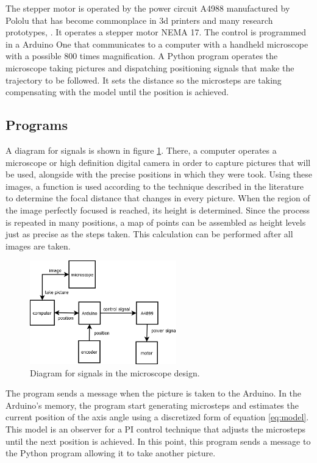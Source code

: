 \documentclass[journal]{IEEEtran}
\begin{document}
The stepper motor is operated by the power circuit A4988 manufactured by Pololu that has become commonplace in 3d printers and many research prototypes, \cite{A4988}. It operates a stepper motor NEMA 17. The control is programmed in a Arduino One that communicates to a computer with a handheld microscope with a possible 800 times magnification. A Python program operates the microscope taking pictures and dispatching positioning signals that make the trajectory to be followed. It sets the distance so the microsteps are taking compensating with the model until the position is achieved.

\subsection{Programs}

A diagram for signals is shown in figure \ref{fig:diagram}. There, a computer operates a microscope or high definition digital camera in order to capture pictures that will be used, alongside with the precise positions in which they were took. Using these images, a function is used according to the technique described in the literature to determine the focal distance that changes in every picture. When the region of the image perfectly focused is reached, its height is determined. Since the process is repeated in many positions, a map of points can be assembled as height levels just as precise as the steps taken. This calculation can be performed after all images are taken.

\begin{figure}[!t]
\centering
\includegraphics[width=2.5in]{microscope.png}
\caption{Diagram for signals in the microscope design.}
\label{fig:diagram}
\end{figure}

The program sends a message when the picture is taken to the Arduino. In the Arduino's memory, the program start generating microsteps and estimates the current position of the axis angle using a discretized form of equation \ref{eq:model}. This model is an observer for a PI control technique that adjusts the microsteps until the next position is achieved. In this point, this program sends a message to the Python program allowing it to take another picture.
\end{document}
